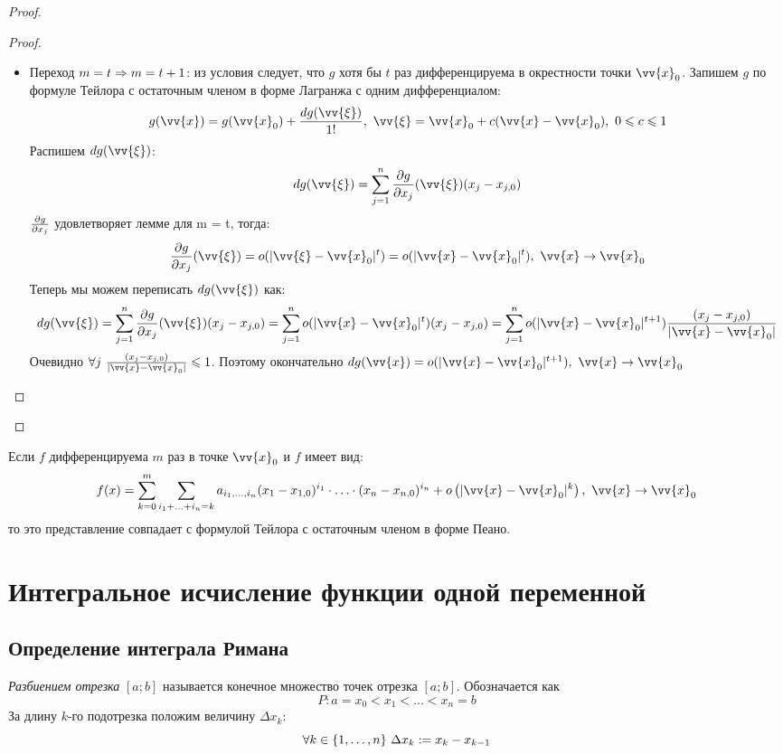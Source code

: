 \begin{proof}
\begin{proof}
\begin{itemize}
			\item Переход $m = t \Rightarrow m = t + 1$: из условия следует, что $g$ хотя бы $t$ раз дифференцируема в окрестности точки $\vv{x}_0$. Запишем $g$ по формуле Тейлора с остаточным членом в форме Лагранжа с одним дифференциалом:
			\[
				g(\vv{x}) = g(\vv{x}_0) + \frac{dg(\vv{\xi})}{1!},\ \vv{\xi} = \vv{x}_0 + c(\vv{x} - \vv{x}_0),\ 0 \le c \le 1
			\]
			Распишем $dg(\vv{\xi})$:
			\[
				dg(\vv{\xi}) = \suml_{j = 1}^n \pd{g}{x_j} (\vv{\xi}) (x_j - x_{j, 0})
			\]
			$\frac{\partial g}{\partial x_j}$ удовлетворяет лемме для m = t, тогда:
			\[
				\pd{g}{x_j}(\vv{\xi}) = o(|\vv{\xi} - \vv{x}_0|^t) = o(|\vv{x} - \vv{x}_0|^t),\ \vv{x} \to \vv{x}_0
			\]
			Теперь мы можем переписать $dg(\vv{\xi})$ как:
			\[
				dg(\vv{\xi}) = \suml_{j = 1}^n \pd{g}{x_j}(\vv{\xi})(x_j - x_{j, 0}) = \suml_{j = 1}^n o(|\vv{x} - \vv{x}_0|^t)(x_j - x_{j, 0}) = \suml_{j = 1}^n o(|\vv{x} - \vv{x}_0|^{t + 1})\frac{(x_j - x_{j, 0})}{|\vv{x} - \vv{x}_0|}
			\]
			Очевидно $\forall j\ \frac{(x_j - x_{j, 0})}{|\vv{x} - \vv{x}_0|} \leq 1$. Поэтому окончательно $dg(\vv{x}) = o(|\vv{x} - \vv{x}_0|^{t + 1}),\ \vv{x} \to \vv{x}_0$
		\end{itemize}
	\end{proof}
\end{proof}

\begin{note}
	Если $f$ дифференцируема $m$ раз в точке $\vv{x}_0$ и $f$ имеет вид:
	\[
		f(x) = \suml_{k = 0}^m \suml_{i_1 + \ldots + i_n = k} a_{i_1, \ldots, i_n} (x_1 - x_{1, 0})^{i_1} \cdot \ldots \cdot (x_n - x_{n, 0})^{i_n} + o\left(|\vv{x} - \vv{x}_0|^k\right),\ \vv{x} \to \vv{x}_0
	\]
	то это представление совпадает с формулой Тейлора с остаточным членом в форме Пеано.
\end{note}

\section{Интегральное исчисление функции одной переменной}

\subsection{Определение интеграла Римана}


\begin{definition}
	\textit{Разбиением отрезка} $[a; b]$ называется конечное множество точек отрезка $[a; b]$. Обозначается как
	\[
		P: a = x_0 < x_1 < \ldots < x_n = b
	\]
	За длину $k$-го подотрезка положим величину $\Delta x_k$:
	\[
		\forall k \in \{1, \ldots, n\}\ \Delta x_k := x_k - x_{k - 1}
	\]
\end{definition}

